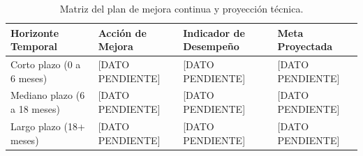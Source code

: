 \begin{table}[htbp]
    \centering
    \caption{Matriz del plan de mejora continua y proyección técnica.}
    \label{tab:plan_mejora}
    \begin{tabular}{llll}
        \toprule
        \textbf{Horizonte Temporal} & \textbf{Acción de Mejora} & \textbf{Indicador de Desempeño} & \textbf{Meta Proyectada} \\
        \midrule
        Corto plazo (0 a 6 meses)   & [DATO PENDIENTE] & [DATO PENDIENTE] & [DATO PENDIENTE] \\
        Mediano plazo (6 a 18 meses)& [DATO PENDIENTE] & [DATO PENDIENTE] & [DATO PENDIENTE] \\
        Largo plazo (18+ meses)     & [DATO PENDIENTE] & [DATO PENDIENTE] & [DATO PENDIENTE] \\
        \bottomrule
    \end{tabular}
\end{table}
